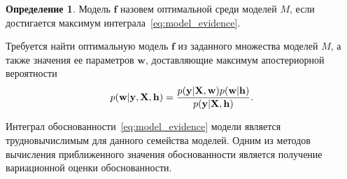 \documentclass[11pt, a5paper]{dissert}
\theoremstyle{definition}
\newtheorem{defin}{Определение}
\begin{document}
\begin{defin}Модель  $\mathbf{f}$ назовем оптимальной среди моделей $M$, если достигается максимум интеграла~\eqref{eq:model_evidence}.
\end{defin}

Требуется найти оптимальную модель $\mathbf{f}$ из заданного множества моделей $M$, а также значения ее параметров $\mathbf{w}$, доставляющие максимум апостериорной вероятности
\begin{equation}
\label{eq:var_inf_posterior}
	p(\mathbf{w}|\mathbf{y},\mathbf{X},\mathbf{h}) = \frac{p(\mathbf{y}|\mathbf{X},\mathbf{w})p(\mathbf{w}|\mathbf{h})}{p(\mathbf{y}|\mathbf{X}, \mathbf{h})}.
\end{equation}

Интеграл обоснованности~\eqref{eq:model_evidence} модели является трудновычислимым для данного семейства моделей. Одним из методов вычисления приближенного значения обоснованности является получение вариационной оценки обоснованности.  

\end{document}
